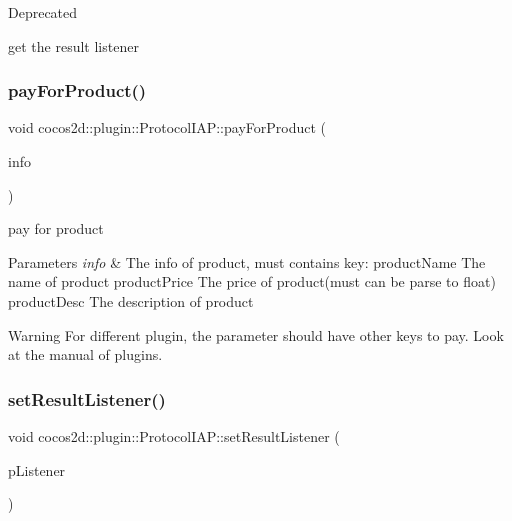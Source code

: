 \begin{DoxyRefDesc}{Deprecated}
\item[\hyperlink{deprecated__deprecated000233}{Deprecated}]get the result listener \end{DoxyRefDesc}
\mbox{\label{classcocos2d_1_1plugin_1_1ProtocolIAP_aee946689b5ec6c570366e29c2c52939f}} 
\subsubsection{\texorpdfstring{pay\+For\+Product()}{payForProduct()}}
{\footnotesize\ttfamily void cocos2d\+::plugin\+::\+Protocol\+I\+A\+P\+::pay\+For\+Product (\begin{DoxyParamCaption}\item[{T\+Product\+Info}]{info }\end{DoxyParamCaption})}



pay for product 


\begin{DoxyParams}{Parameters}
{\em info} & The info of product, must contains key\+: product\+Name The name of product product\+Price The price of product(must can be parse to float) product\+Desc The description of product \\
\hline
\end{DoxyParams}
\begin{DoxyWarning}{Warning}
For different plugin, the parameter should have other keys to pay. Look at the manual of plugins. 
\end{DoxyWarning}
\mbox{\label{classcocos2d_1_1plugin_1_1ProtocolIAP_a1007416d75f6215930e54626be8a64ea}} 
\subsubsection{\texorpdfstring{set\+Result\+Listener()}{setResultListener()}}
{\footnotesize\ttfamily void cocos2d\+::plugin\+::\+Protocol\+I\+A\+P\+::set\+Result\+Listener (\begin{DoxyParamCaption}\item[{\hyperlink{classcocos2d_1_1plugin_1_1PayResultListener}{Pay\+Result\+Listener} $\ast$}]{p\+Listener }\end{DoxyParamCaption})}

